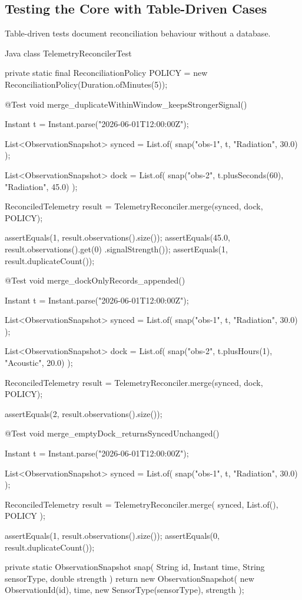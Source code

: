 \subsection{Testing the Core with Table-Driven Cases}
\label{sec:fcis_reconciliation_test}

Table-driven tests document reconciliation behaviour without a database.

\begin{ridercode}{Java}
class TelemetryReconcilerTest
{
    private static final ReconciliationPolicy POLICY =
        new ReconciliationPolicy(Duration.ofMinutes(5));

    @Test
    void merge_duplicateWithinWindow_keepsStrongerSignal()
    {
        Instant t = Instant.parse("2026-06-01T12:00:00Z");

        List<ObservationSnapshot> synced = List.of(
            snap("obs-1", t, "Radiation", 30.0)
        );

        List<ObservationSnapshot> dock = List.of(
            snap("obs-2", t.plusSeconds(60), "Radiation", 45.0)
        );

        ReconciledTelemetry result =
            TelemetryReconciler.merge(synced, dock, POLICY);

        assertEquals(1, result.observations().size());
        assertEquals(45.0, result.observations().get(0)
            .signalStrength());
        assertEquals(1, result.duplicateCount());
    }

    @Test
    void merge_dockOnlyRecords_appended()
    {
        Instant t = Instant.parse("2026-06-01T12:00:00Z");

        List<ObservationSnapshot> synced = List.of(
            snap("obs-1", t, "Radiation", 30.0)
        );

        List<ObservationSnapshot> dock = List.of(
            snap("obs-2", t.plusHours(1), "Acoustic", 20.0)
        );

        ReconciledTelemetry result =
            TelemetryReconciler.merge(synced, dock, POLICY);

        assertEquals(2, result.observations().size());
    }

    @Test
    void merge_emptyDock_returnsSyncedUnchanged()
    {
        Instant t = Instant.parse("2026-06-01T12:00:00Z");

        List<ObservationSnapshot> synced = List.of(
            snap("obs-1", t, "Radiation", 30.0)
        );

        ReconciledTelemetry result =
            TelemetryReconciler.merge(
                synced,
                List.of(),
                POLICY
            );

        assertEquals(1, result.observations().size());
        assertEquals(0, result.duplicateCount());
    }

    private static ObservationSnapshot snap(
        String id,
        Instant time,
        String sensorType,
        double strength
    )
    {
        return new ObservationSnapshot(
            new ObservationId(id),
            time,
            new SensorType(sensorType),
            strength
        );
    }
}
\end{ridercode}
